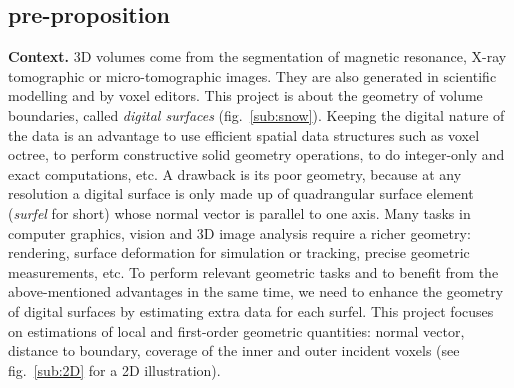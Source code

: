 \subsection{pre-proposition}

\noindent\textbf{Context.} 
3D volumes come from the segmentation of magnetic resonance, X-ray tomographic or micro-tomographic images. 
They are also generated in scientific modelling and by voxel editors. 
This project is about the geometry of volume boundaries, called \emph{digital surfaces} (fig.~\ref{sub:snow}). 
Keeping the digital nature of the data is an advantage
to use efficient spatial data structures such as voxel octree, 
to perform constructive solid geometry operations,
to do integer-only and exact computations, etc.
A drawback is its poor geometry, because at any resolution a digital surface is only 
made up of quadrangular surface element (\emph{surfel} for short) 
whose normal vector is parallel to one axis. 
Many tasks in computer graphics, vision and 3D image analysis require a richer geometry: 
rendering, surface deformation for simulation or tracking, precise geometric measurements, etc.
To perform relevant geometric tasks and 
to benefit from the above-mentioned advantages in the same time, 
we need to enhance the geometry of digital surfaces by estimating extra data for each surfel. 
This project focuses on estimations of local and first-order geometric quantities: 
normal vector, distance to boundary, coverage of the inner and outer incident voxels 
(see fig.~\ref{sub:2D} for a 2D illustration).  


